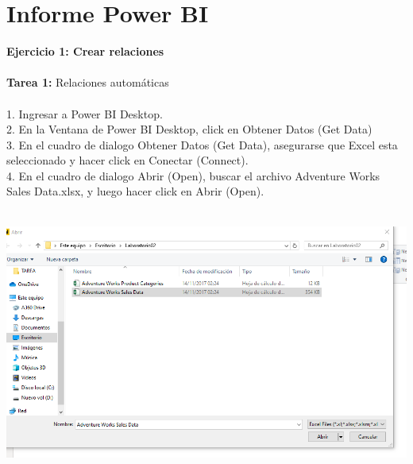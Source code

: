 \section{Informe Power BI} 
\begin{flushleft}


\begin{itemize}
\textbf{Ejercicio 1: Crear relaciones}\\
\textbf{ }\\
\textbf{Tarea 1:  } Relaciones automáticas\\
\textbf{ }\\

 1. Ingresar a Power BI Desktop.\\
 2. En la Ventana de Power BI Desktop, click en Obtener Datos (Get Data)\\
 3. En el cuadro de dialogo Obtener Datos (Get Data), asegurarse que Excel esta seleccionado y hacer click
en Conectar (Connect).\\
 4. En el cuadro de dialogo Abrir (Open), buscar el archivo Adventure Works Sales Data.xlsx, y luego hacer
click en Abrir (Open).\\
\textbf{ }\\
\begin{center}
	\includegraphics[width=20cm]{./Imagenes/img1} 
	\end{center}
\textbf{ }\\
\textbf{ }\\
\textbf{ }\\
\textbf{ }\\
\textbf{ }\\
\textbf{ }\\
\textbf{ }\\
\textbf{ }\\
\textbf{ }\\

\end{itemize}
\end{flushleft}
